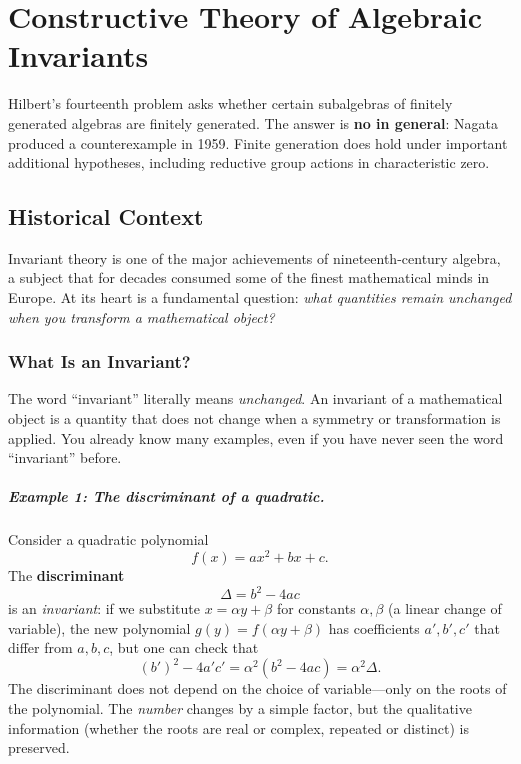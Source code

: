 
\chapter{Constructive Theory of Algebraic Invariants}

\begin{solvedbox}
Hilbert's fourteenth problem asks whether certain subalgebras of finitely generated algebras are finitely generated. The answer is \textbf{no in general}: Nagata produced a counterexample in 1959. Finite generation does hold under important additional hypotheses, including reductive group actions in characteristic zero.
\end{solvedbox}

\section{Historical Context}

Invariant theory is one of the major achievements of nineteenth-century algebra, a subject that for decades consumed some of the finest mathematical minds in Europe. At its heart is a fundamental question: \emph{what quantities remain unchanged when you transform a mathematical object?}

\subsection{What Is an Invariant?}

The word ``invariant'' literally means \emph{unchanged}. An invariant of a mathematical object is a quantity that does not change when a symmetry or transformation is applied. You already know many examples, even if you have never seen the word ``invariant'' before.

\paragraph{Example 1: The discriminant of a quadratic.}
Consider a quadratic polynomial
\[
    f(x) = ax^2 + bx + c.
\]
The \textbf{discriminant}
\[
    \Delta = b^2 - 4ac
\]
is an \emph{invariant}: if we substitute $x = \alpha y + \beta$ for constants $\alpha, \beta$ (a linear change of variable), the new polynomial $g(y) = f(\alpha y + \beta)$ has coefficients $a', b', c'$ that differ from $a, b, c$, but one can check that
\[
    (b')^2 - 4a'c' = \alpha^2(b^2 - 4ac) = \alpha^2 \Delta.
\]
The discriminant does not depend on the choice of variable---only on the roots of the polynomial. The \emph{number} changes by a simple factor, but the qualitative information (whether the roots are real or complex, repeated or distinct) is preserved.

